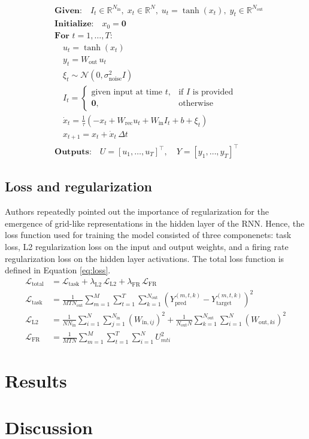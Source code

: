 \documentclass{article}
\begin{document}
\[
\begin{aligned}
&\textbf{Given:} \quad
I_t \in \mathbb{R}^{N_{\text{in}}}, \;
x_t \in \mathbb{R}^{N}, \;
u_t = \tanh(x_t), \;
y_t \in \mathbb{R}^{N_{\text{out}}} \\[6pt]
&\textbf{Initialize:} \quad
x_0 = \mathbf{0} \\[8pt]
&\textbf{For } t = 1, \dots, T: \\[3pt]
&\quad u_t = \tanh(x_t) \\[3pt]
&\quad y_t = W_{\text{out}} \, u_t \\[3pt]
&\quad \xi_t \sim \mathcal{N}(0, \sigma_{\text{noise}}^2 I) \\[3pt]
&\quad I_t = 
\begin{cases}
\text{given input at time } t, & \text{if } I \text{ is provided} \\
\mathbf{0}, & \text{otherwise}
\end{cases} \\[6pt]
&\quad \dot{x}_t = 
\frac{1}{\tau}
\left( 
   -x_t 
   + W_{\text{rec}} u_t 
   + W_{\text{in}} I_t 
   + b 
   + \xi_t
\right) \\[6pt]
&\quad x_{t+1} = x_t + \dot{x}_t \, \Delta t \\[10pt]
&\textbf{Outputs:} \quad
U = [u_1, \dots, u_T]^\top, \quad
Y = [y_1, \dots, y_T]^\top
\label{eq:rnn}
\end{aligned}
\]


\subsection{Loss and regularization}
Authors repeatedly pointed out the importance of regularization for the emergence of grid-like representations in the hidden layer of the RNN. Hence, the loss function used for training the model consisted of three componenets: task loss, L2 regularization loss on the input and output weights, and a firing rate regularization loss on the hidden layer activations. The total loss function is defined in Equation \ref{eq:loss}.
\[
\begin{aligned}
\mathcal{L}_{\text{total}} 
&= \mathcal{L}_{\text{task}} 
   + \lambda_{\text{L2}} \, \mathcal{L}_{\text{L2}} 
   + \lambda_{\text{FR}} \, \mathcal{L}_{\text{FR}} \\[6pt]
\mathcal{L}_{\text{task}} 
&= \frac{1}{M T N_{\text{out}}} 
   \sum_{m=1}^{M} \sum_{t=1}^{T} \sum_{k=1}^{N_{\text{out}}}
   \left( Y_{\text{pred}}^{(m,t,k)} - Y_{\text{target}}^{(m,t,k)} \right)^2 \\[6pt]
\mathcal{L}_{\text{L2}} 
&= \frac{1}{N N_{\text{in}}} \sum_{i=1}^{N} \sum_{j=1}^{N_{\text{in}}} 
   (W_{\text{in},ij})^2
   + \frac{1}{N_{\text{out}} N} \sum_{k=1}^{N_{\text{out}}} \sum_{i=1}^{N}
   (W_{\text{out},ki})^2 \\[6pt]
\mathcal{L}_{\text{FR}} 
&= \frac{1}{M T N} \sum_{m=1}^{M} \sum_{t=1}^{T} \sum_{i=1}^{N} 
   U_{mti}^2
\label{eq:loss}
\end{aligned}
\]



\section{Results}

\section{Discussion}





\end{document}
